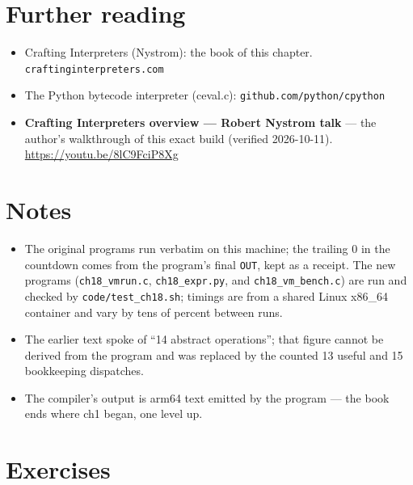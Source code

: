 \section*{Further reading}
\begin{itemize}
\item Crafting Interpreters (Nystrom): the book of this chapter.
      \\ \texttt{craftinginterpreters.com}
\item The Python bytecode interpreter (ceval.c): \texttt{github.com/python/cpython}
\end{itemize}

\begin{rulebox}
\begin{itemize}
\item \textbf{Crafting Interpreters overview --- Robert Nystrom
      talk} --- the author's walkthrough of this exact build
      (verified 2026-10-11).
      \url{https://youtu.be/8lC9FciP8Xg}
\end{itemize}
\end{rulebox}

\section*{Notes}
\begin{itemize}
\item The original programs run verbatim on this machine; the trailing 0 in
      the countdown comes from the program's final \texttt{OUT}, kept as
      a receipt. The new programs (\texttt{ch18\_vmrun.c},
      \texttt{ch18\_expr.py}, and \texttt{ch18\_vm\_bench.c}) are run and
      checked by \texttt{code/test\_ch18.sh}; timings are from a shared
      Linux x86\_64 container and vary by tens of percent between runs.
\item The earlier text spoke of ``14 abstract operations''; that figure
      cannot be derived from the program and was replaced by the counted
      13 useful and 15 bookkeeping dispatches.
\item The compiler's output is arm64 text emitted by the program ---
      the book ends where ch1 began, one level up.
\end{itemize}

\section*{Exercises}

